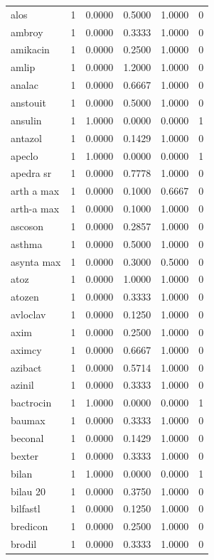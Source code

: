 \begin{longtable}{p{3.0cm}rrrrr}
alos & 1 & 0.0000 & 0.5000 & 1.0000 & 0 \\
ambroy & 1 & 0.0000 & 0.3333 & 1.0000 & 0 \\
amikacin & 1 & 0.0000 & 0.2500 & 1.0000 & 0 \\
amlip & 1 & 0.0000 & 1.2000 & 1.0000 & 0 \\
analac & 1 & 0.0000 & 0.6667 & 1.0000 & 0 \\
anstouit & 1 & 0.0000 & 0.5000 & 1.0000 & 0 \\
ansulin & 1 & 1.0000 & 0.0000 & 0.0000 & 1 \\
antazol & 1 & 0.0000 & 0.1429 & 1.0000 & 0 \\
apeclo & 1 & 1.0000 & 0.0000 & 0.0000 & 1 \\
apedra sr & 1 & 0.0000 & 0.7778 & 1.0000 & 0 \\
arth a max & 1 & 0.0000 & 0.1000 & 0.6667 & 0 \\
arth-a max & 1 & 0.0000 & 0.1000 & 1.0000 & 0 \\
ascoson & 1 & 0.0000 & 0.2857 & 1.0000 & 0 \\
asthma & 1 & 0.0000 & 0.5000 & 1.0000 & 0 \\
asynta max & 1 & 0.0000 & 0.3000 & 0.5000 & 0 \\
atoz & 1 & 0.0000 & 1.0000 & 1.0000 & 0 \\
atozen & 1 & 0.0000 & 0.3333 & 1.0000 & 0 \\
avloclav & 1 & 0.0000 & 0.1250 & 1.0000 & 0 \\
axim & 1 & 0.0000 & 0.2500 & 1.0000 & 0 \\
aximcy & 1 & 0.0000 & 0.6667 & 1.0000 & 0 \\
azibact & 1 & 0.0000 & 0.5714 & 1.0000 & 0 \\
azinil & 1 & 0.0000 & 0.3333 & 1.0000 & 0 \\
bactrocin & 1 & 1.0000 & 0.0000 & 0.0000 & 1 \\
baumax & 1 & 0.0000 & 0.3333 & 1.0000 & 0 \\
beconal & 1 & 0.0000 & 0.1429 & 1.0000 & 0 \\
bexter & 1 & 0.0000 & 0.3333 & 1.0000 & 0 \\
bilan & 1 & 1.0000 & 0.0000 & 0.0000 & 1 \\
bilau 20 & 1 & 0.0000 & 0.3750 & 1.0000 & 0 \\
bilfastl & 1 & 0.0000 & 0.1250 & 1.0000 & 0 \\
bredicon & 1 & 0.0000 & 0.2500 & 1.0000 & 0 \\
brodil & 1 & 0.0000 & 0.3333 & 1.0000 & 0 \\

\end{longtable}
